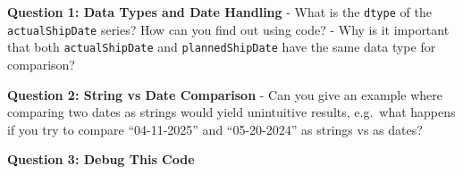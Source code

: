 \documentclass[
]{article}
\begin{document}
\begin{tcolorbox}[enhanced jigsaw, colbacktitle=quarto-callout-important-color!10!white, toptitle=1mm, colframe=quarto-callout-important-color-frame, bottomtitle=1mm, colback=white, left=2mm, breakable, coltitle=black, bottomrule=.15mm, rightrule=.15mm, titlerule=0mm, opacityback=0, title=\textcolor{quarto-callout-important-color}{\faExclamation}\hspace{0.5em}{🤔 Discussion Questions: Assign Mental Model}, arc=.35mm, opacitybacktitle=0.6, toprule=.15mm, leftrule=.75mm]

\textbf{Question 1: Data Types and Date Handling} - What is the
\texttt{dtype} of the \texttt{actualShipDate} series? How can you find
out using code? - Why is it important that both \texttt{actualShipDate}
and \texttt{plannedShipDate} have the same data type for comparison?

\textbf{Question 2: String vs Date Comparison} - Can you give an example
where comparing two dates as strings would yield unintuitive results,
e.g.~what happens if you try to compare ``04-11-2025'' and
``05-20-2024'' as strings vs as dates?

\textbf{Question 3: Debug This Code}


\end{tcolorbox}
\end{document}
